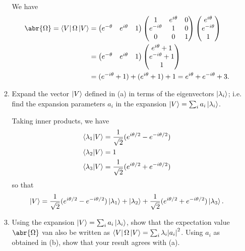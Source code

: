 \documentclass[11pt]{article}
\begin{document}
\begin{enumerate}[label=25.\arabic*]
\begin{enumerate}[label=(\alph*)]
        We have \begin{align*}
            \abr{\Omega} = \bra{V}\Omega\ket{V} &= \begin{pmatrix}
                e^{-\theta} & e^{i\theta} & 1
            \end{pmatrix}\begin{pmatrix}
                1 & e^{i\theta} & 0 \\
                e^{-i\theta} & 1 & 0 \\
                0 & 0 & 1
            \end{pmatrix}\begin{pmatrix}
                e^{i\theta}\\e^{-i\theta}\\1
            \end{pmatrix}\\
            &= \begin{pmatrix}
                e^{-\theta} & e^{i\theta} & 1
            \end{pmatrix}\begin{pmatrix}
                e^{i\theta}+1\\e^{-i\theta}+1\\1
            \end{pmatrix}\\
            &= (e^{-i\theta}+1) + (e^{i\theta}+1) + 1 = e^{i\theta}+e^{-i\theta}+3.
        \end{align*}
        \item Expand the vector $\ket{V}$ defined in (a) in terms of the eigenvectors $\ket{\lambda_i}$; i.e. find the expansion parameters $a_i$ in the expansion $\ket{V} = \sum_i a_i\ket{\lambda_i}$.
        
        Taking inner products, we have \begin{align*}
            \bra{\lambda_1}\ket{V} &= \frac{1}{\sqrt{2}}(e^{i\theta/2} - e^{-i\theta/2})\\
            \bra{\lambda_2}\ket{V} &= 1\\
            \bra{\lambda_3}\ket{V} &= \frac{1}{\sqrt{2}}(e^{i\theta/2} + e^{-i\theta/2})
        \end{align*} so that \[\ket{V} = \frac{1}{\sqrt{2}}(e^{i\theta/2} - e^{-i\theta/2})\ket{\lambda_1} + \ket{\lambda_2} + \frac{1}{\sqrt{2}}(e^{i\theta/2} + e^{-i\theta/2})\ket{\lambda_3}.\]
        \item Using the expansion $\ket{V} = \sum_i a_i\ket{\lambda_i}$, show that the expectation value $\abr{\Omega}$ van also be written as $\bra{V}\Omega\ket{V} = \sum_i \lambda_i\abs{a_i}^2$. Using $a_i$ as obtained in (b), show that your result agrees with (a).
        

\end{enumerate}
\end{enumerate}
\end{document}

